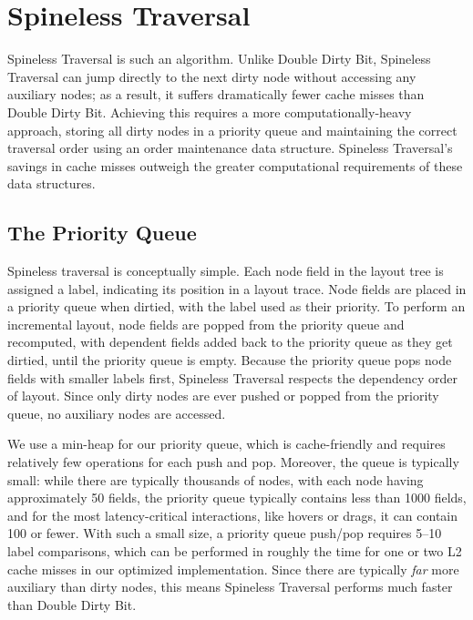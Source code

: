 \section{Spineless Traversal}

Spineless Traversal is such an algorithm.
Unlike Double Dirty Bit,
  Spineless Traversal can jump directly to the next dirty node
  without accessing any auxiliary nodes;
  as a result, it suffers dramatically fewer cache misses
  than Double Dirty Bit.
Achieving this requires a more computationally-heavy approach,
  storing all dirty nodes in a priority queue
  and maintaining the correct traversal order
  using an order maintenance data structure.
Spineless Traversal's savings in cache misses
  outweigh the greater computational requirements
  of these data structures.

\subsection{The Priority Queue}

Spineless traversal is conceptually simple.
Each node field in the layout tree is assigned a label,
  indicating its position in a layout trace.
Node fields are placed in a priority queue when dirtied,
  with the label used as their priority.
To perform an incremental layout,
  node fields are popped from the priority queue and recomputed,
  with dependent fields
  added back to the priority queue as they get dirtied,
  until the priority queue is empty.
Because the priority queue pops node fields with smaller labels first,
  Spineless Traversal respects the dependency order of layout.
Since only dirty nodes are ever pushed or popped from the priority queue,
  no auxiliary nodes are accessed.

We use a min-heap for our priority queue,
  which is cache-friendly and requires relatively few operations
  for each push and pop.
Moreover, the queue is typically small:
  while there are typically thousands of nodes,
  with each node having approximately 50 fields,
  the priority queue typically contains less than 1000 fields,
  and for the most latency-critical interactions,
  like hovers or drags, it can contain 100 or fewer.
With such a small size, a priority queue push/pop requires
  5--10 label comparisons,
  which can be performed in roughly the time
  for one or two L2 cache misses
  in our optimized implementation.
Since there are typically \emph{far} more auxiliary than dirty nodes,
  this means Spineless Traversal performs much faster
  than Double Dirty Bit.

